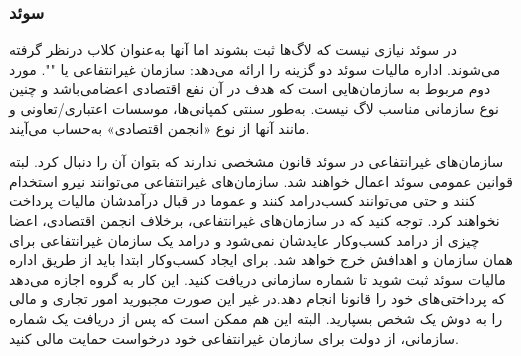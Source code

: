 \subsubsection{سوئد}
در سوئد نیازی نیست که لاگ‌ها ثبت بشوند اما آنها به‌عنوان کلاب
درنظر گرفته می‌شوند. اداره مالیات سوئد دو گزینه را ارائه می‌دهد:
سازمان غیرانتفاعی یا
"".
مورد دوم مربوط به سازمان‌هایی
است که هدف در آن نفع اقتصادی اعضامی‌باشد و چنین نوع سازمانی مناسب
لاگ نیست. به‌طور سنتی کمپانی‌ها، موسسات اعتباری/تعاونی و مانند آنها
از نوع «انجمن اقتصادی» به‌حساب می‌آیند.

سازمان‌های غیرانتفاعی در سوئد قانون مشخصی ندارند که بتوان آن را دنبال کرد.
لبته قوانین عمومی سوئد اعمال خواهند شد. سازمان‌های غیرانتفاعی می‌توانند نیرو
استخدام کنند و حتی می‌توانند کسب‌درامد کنند و عموما در قبال درآمدشان مالیات
پرداخت نخواهند کرد. توجه کنید که در سازمان‌های غیرانتفاعی، برخلاف انجمن اقتصادی،
اعضا چیزی از درامد کسب‌وکار عایدشان نمی‌شود و درامد یک سازمان غیرانتفاعی برای همان
سازمان و اهدافش خرج خواهد شد.
برای ایجاد کسب‌وکار ابتدا باید از طریق اداره مالیات سوئد ثبت شوید تا
شماره سازمانی دریافت کنید. این کار به گروه اجازه می‌دهد که پرداختی‌های خود را
قانونا انجام دهد.در غیر این صورت مجبورید امور تجاری و مالی را به دوش یک شخص
بسپارید.
البته این هم ممکن است که پس از دریافت یک شماره سازمانی، از دولت برای سازمان
غیرانتفاعی خود درخواست حمایت مالی کنید.

